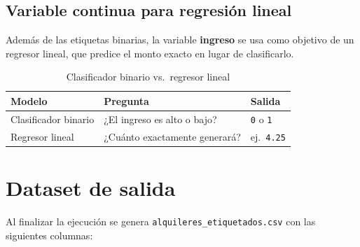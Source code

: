 \documentclass[12pt,a4paper]{article}
\begin{document}
\subsection{Variable continua para regresi\'on lineal}

Adem\'as de las etiquetas binarias, la variable \textbf{ingreso} se usa
como objetivo de un regresor lineal, que predice el monto exacto en lugar
de clasificarlo.

\begin{table}[H]
  \centering
  \caption{Clasificador binario vs.\ regresor lineal}
  \begin{tabular}{lll}
    \toprule
    \textbf{Modelo}      & \textbf{Pregunta}               & \textbf{Salida} \\
    \midrule
    Clasificador binario & ¿El ingreso es alto o bajo?     & \texttt{0} o \texttt{1} \\
    Regresor lineal      & ¿Cu\'anto exactamente generar\'a? & ej.\ \texttt{4.25} \\
    \bottomrule
  \end{tabular}
\end{table}

\section{Dataset de salida}

Al finalizar la ejecuci\'on se genera \texttt{alquileres\_etiquetados.csv}
con las siguientes columnas:
\end{document}
